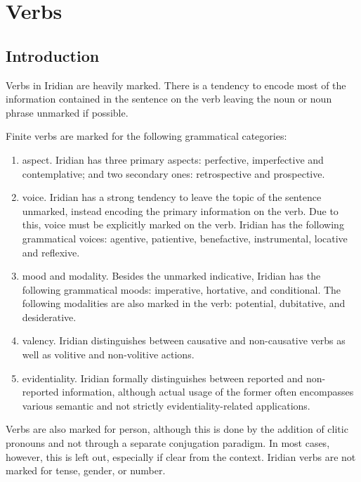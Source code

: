 \chapter{Verbs}

\section{Introduction}

Verbs in Iridian are heavily marked. There is a tendency to encode most of the
information contained in the sentence on the verb leaving the noun or noun
phrase unmarked if possible. 

Finite verbs are marked for the following grammatical
categories:
\begin{enumerate}
	\item {\sc aspect}. Iridian has three primary aspects:
	perfective, imperfective and contemplative; and two secondary ones:
	retrospective and prospective.
	\item {\sc voice}. Iridian has a strong tendency to leave the
	topic of the sentence unmarked, instead encoding the primary information on
	the verb. Due to this, voice must be explicitly marked on the verb. Iridian
	has the following grammatical voices: agentive, patientive, benefactive,
	instrumental, locative and reflexive.
	\item {\sc mood and modality}. Besides the unmarked indicative,
	Iridian has the following grammatical moods: imperative, hortative, and
	conditional. The following modalities are also marked in the verb:
	potential, dubitative, and desiderative.
	\item {\sc valency}. Iridian distinguishes between causative
	and non-causative verbs as well as volitive and non-volitive actions.
	\item {\sc evidentiality}. Iridian formally
	distinguishes between reported and non-reported information, although actual
	usage of the former often encompasses various semantic and not strictly
	evidentiality-related applications.
\end{enumerate}

Verbs are also marked for person, although this is done by the addition of
clitic pronouns and not through a separate conjugation paradigm. In most cases,
however, this is left out, especially if clear from the context. Iridian verbs
are not marked for tense, gender, or number.

